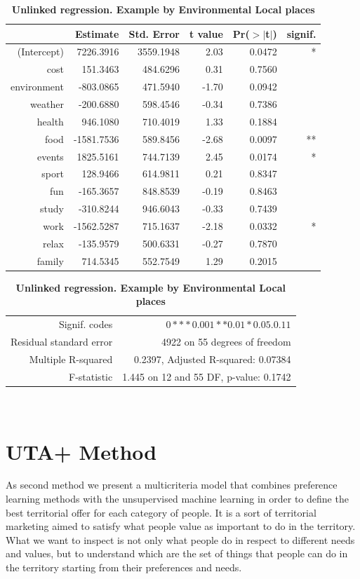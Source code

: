 \documentclass[a4paper]{article}
\begin{document}
\begin{table}[ht]
\centering
\begin{tabular}{rrrrrr}
  \hline
 & Estimate & Std. Error & t value & Pr($>$$|$t$|$)& signif. \\
  \hline
(Intercept) & 7226.3916 & 3559.1948 & 2.03 & 0.0472&* \\
  cost & 151.3463 & 484.6296 & 0.31 & 0.7560 \\
  environment & -803.0865 & 471.5940 & -1.70 & 0.0942 \\
  weather & -200.6880 & 598.4546 & -0.34 & 0.7386 \\
  health & 946.1080 & 710.4019 & 1.33 & 0.1884 \\
  food & -1581.7536 & 589.8456 & -2.68 & 0.0097&** \\
  events & 1825.5161 & 744.7139 & 2.45 & 0.0174&* \\
  sport & 128.9466 & 614.9811 & 0.21 & 0.8347 \\
  fun & -165.3657 & 848.8539 & -0.19 & 0.8463 \\
  study & -310.8244 & 946.6043 & -0.33 & 0.7439 \\
  work & -1562.5287 & 715.1637 & -2.18 & 0.0332&* \\
  relax & -135.9579 & 500.6331 & -0.27 & 0.7870 \\
  family & 714.5345 & 552.7549 & 1.29 & 0.2015 \\
   \hline
 \end{tabular}
\begin{tabular}{rr}
Signif. codes&  $0 *** 0.001 ** 0.01 * 0.05 . 0.1   1$\\

Residual standard error& 4922 on 55 degrees of freedom\\

Multiple R-squared&  0.2397,    Adjusted R-squared:  0.07384\\

F-statistic& 1.445 on 12 and 55 DF,  p-value: 0.1742\\
   \hline
\end{tabular}
\caption{\textbf{Unlinked regression. Example by Environmental Local places}}\
\label{Table1}
\end{table}

\section{UTA+ Method}
As second method we present a multicriteria model that combines preference learning methods with the unsupervised machine learning in order to define the best territorial offer for each category of people. It is a sort of territorial marketing aimed to satisfy what people value as important to do \cite{Sen1999} in the territory.  What we want to inspect is not only what people do in respect to different needs and values, but to understand which are the set of things that people can do in the territory starting from their preferences and needs.
\end{document}
